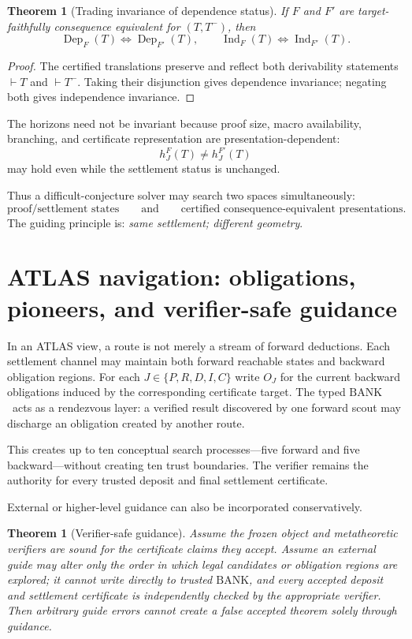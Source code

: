 \documentclass[11pt]{article}
\newtheorem{theorem}[definition]{Theorem}
\theoremstyle{remark}
\newcommand{\BANK}{\ensuremath{\mathrm{BANK}}}
\newcommand{\Dep}{\operatorname{Dep}}
\newcommand{\Ind}{\operatorname{Ind}}
\begin{document}
\begin{theorem}[Trading invariance of dependence status]
If $F$ and $F'$ are target-faithfully consequence equivalent for $(T,T^-)$, then
\[
\Dep_F(T)\iff\Dep_{F'}(T),
\qquad
\Ind_F(T)\iff\Ind_{F'}(T).
\]
\end{theorem}

\begin{proof}
The certified translations preserve and reflect both derivability statements $\vdash T$ and $\vdash T^-$. Taking their disjunction gives dependence invariance; negating both gives independence invariance.
\end{proof}

The horizons need not be invariant because proof size, macro availability, branching, and certificate representation are presentation-dependent:
\[
h_J^F(T)\ne h_J^{F'}(T)
\]
may hold even while the settlement status is unchanged.

Thus a difficult-conjecture solver may search two spaces simultaneously:
\[
\boxed{\text{proof/settlement states}}
\qquad\text{and}\qquad
\boxed{\text{certified consequence-equivalent presentations}.}
\]
The guiding principle is: \emph{same settlement; different geometry}.

\section{ATLAS navigation: obligations, pioneers, and verifier-safe guidance}

In an ATLAS view, a route is not merely a stream of forward deductions. Each settlement channel may maintain both forward reachable states and backward obligation regions. For each $J\in\{P,R,D,I,C\}$ write $O_J$ for the current backward obligations induced by the corresponding certificate target. The typed \BANK\ acts as a rendezvous layer: a verified result discovered by one forward scout may discharge an obligation created by another route.

This creates up to ten conceptual search processes---five forward and five backward---without creating ten trust boundaries. The verifier remains the authority for every trusted deposit and final settlement certificate.

External or higher-level guidance can also be incorporated conservatively.

\begin{theorem}[Verifier-safe guidance]
Assume the frozen object and metatheoretic verifiers are sound for the certificate claims they accept. Assume an external guide may alter only the order in which legal candidates or obligation regions are explored; it cannot write directly to trusted \BANK, and every accepted deposit and settlement certificate is independently checked by the appropriate verifier. Then arbitrary guide errors cannot create a false accepted theorem solely through guidance.
\end{theorem}
\end{document}
